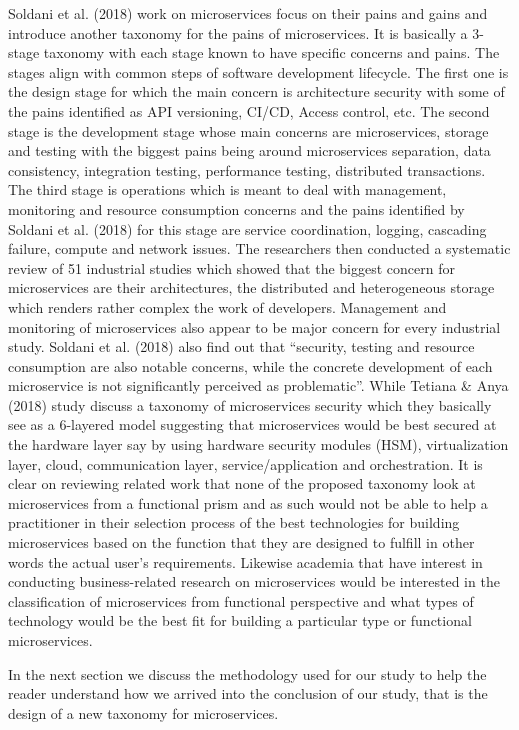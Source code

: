 \documentclass{article}
\begin{document}
Soldani et al. (2018) work on microservices focus on their pains and gains and introduce another taxonomy for the pains of microservices. It is basically a 3-stage taxonomy with each stage known to have specific concerns and pains. The stages align with common steps of software development lifecycle. The first one is the design stage for which the main concern is architecture security with some of the pains identified as API versioning, CI/CD, Access control, etc. The second stage is the development stage whose main concerns are microservices, storage and testing with the biggest pains being around microservices separation, data consistency, integration testing, performance testing, distributed transactions. The third stage is operations which is meant to deal with management, monitoring and resource consumption concerns and the pains identified by Soldani et al. (2018) for this stage are service coordination, logging, cascading failure, compute and network issues. The researchers then conducted a systematic review of 51 industrial studies which showed that the biggest concern for microservices are their architectures, the distributed and heterogeneous storage which renders rather complex the work of developers. Management and monitoring of microservices also appear to be major concern for every industrial study. Soldani et al. (2018) also find out that “security, testing and resource consumption are also notable concerns, while the concrete development of each microservice is not significantly perceived as problematic”. While Tetiana \& Anya (2018) study discuss a taxonomy of microservices security which they basically see as a 6-layered model suggesting that microservices would be best secured at the hardware layer say by using hardware security modules (HSM), virtualization layer, cloud, communication layer, service/application and orchestration. It is clear on reviewing related work that none of the proposed taxonomy look at microservices from a functional prism and as such would not be able to help a practitioner in their selection process of the best technologies for building microservices based on the function that they are designed to fulfill in other words the actual user's requirements. Likewise academia that have interest in conducting business-related research on microservices would be interested in the classification of microservices from functional perspective and what types of technology would be the best fit for building a particular type or functional microservices.


In the next section we discuss the methodology used for our study to help the reader understand how we arrived into the conclusion of our study, that is the design of a new taxonomy for microservices.
\end{document}
